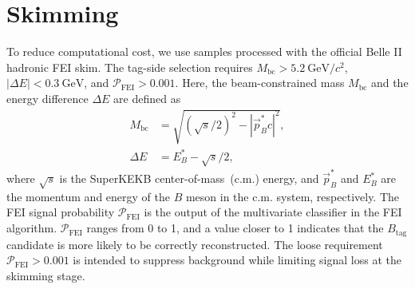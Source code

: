\section{Skimming}
To reduce computational cost, we use samples processed with the official Belle II hadronic FEI skim.
The tag-side selection requires $M_{\textrm{bc}} > 5.2~\textrm{GeV}/c^{2}$, $|\Delta E| < 0.3~\textrm{GeV}$, and $\mathcal{P}_{\textrm{FEI}} > 0.001$.
Here, the beam-constrained mass $M_{\textrm{bc}}$ and the energy difference $\Delta E$ are defined as
\begin{equation}
\begin{aligned}
  M_{\textrm{bc}} &= \sqrt{(\sqrt{s}/2)^{2}-|\vec{p}_{B}^{*}c|^{2}},\\
  \Delta E &= E_{B}^{*} - \sqrt{s}/2,
\end{aligned}
\end{equation}
where $\sqrt{s}$ is the SuperKEKB center-of-mass~(c.m.) energy, and $\vec{p}_{B}^{*}$ and $E_{B}^{*}$ are the momentum and energy of the $B$ meson in the c.m. system, respectively.
The FEI signal probability $\mathcal{P}_{\textrm{FEI}}$ is the output of the multivariate classifier in the FEI algorithm.
$\mathcal{P}_{\textrm{FEI}}$ ranges from 0 to 1, and a value closer to 1 indicates that the $B_{\textrm{tag}}$ candidate is more likely to be correctly reconstructed.
The loose requirement $\mathcal{P}_{\textrm{FEI}} > 0.001$ is intended to suppress background while limiting signal loss at the skimming stage.


